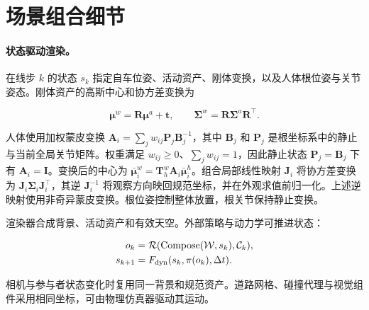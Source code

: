 \section{场景组合细节}
\label{sec:supp-composition}

\paragraph{状态驱动渲染。}

在线步 $k$ 的状态 $s_k$ 指定自车位姿、活动资产、刚体变换，以及人体根位姿与关节姿态。刚体资产的高斯中心和协方差变换为

\begin{equation}
\boldsymbol\mu^w=\mathbf R\boldsymbol\mu^a+\mathbf t,
\qquad
\boldsymbol\Sigma^w=\mathbf R\boldsymbol\Sigma^a\mathbf R^\top.
\label{eq:rigid}
\end{equation}

人体使用加权蒙皮变换 $\mathbf A_i=\sum_j w_{ij}\mathbf P_j\mathbf B_j^{-1}$，其中 $\mathbf B_j$ 和 $\mathbf P_j$ 是根坐标系中的静止与当前全局关节矩阵。权重满足 $w_{ij}\geq0$、$\sum_j w_{ij}=1$，因此静止状态 $\mathbf P_j=\mathbf B_j$ 下有 $\mathbf A_i=\mathbf I$。变换后的中心为 $\bar{\boldsymbol\mu}_i^w=\mathbf T^w_h\mathbf A_i\bar{\boldsymbol\mu}_i^h$。组合局部线性映射 $\mathbf J_i$ 将协方差变换为 $\mathbf J_i\boldsymbol\Sigma_i\mathbf J_i^\top$，其逆 $\mathbf J_i^{-1}$ 将观察方向映回规范坐标，并在外观求值前归一化。上述逆映射使用非奇异蒙皮变换。根位姿控制整体放置，根关节保持静止变换。

渲染器合成背景、活动资产和有效天空。外部策略与动力学可推进状态：

\begin{align}
o_k&=\mathcal R(\operatorname{Compose}(\mathcal W,s_k),\mathcal C_k),\\
s_{k+1}&=F_{\rm dyn}(s_k,\pi(o_k),\Delta t).
\label{eq:simulation}
\end{align}

相机与参与者状态变化时复用同一背景和规范资产。道路网格、碰撞代理与视觉组件采用相同坐标，可由物理仿真器驱动其运动。
